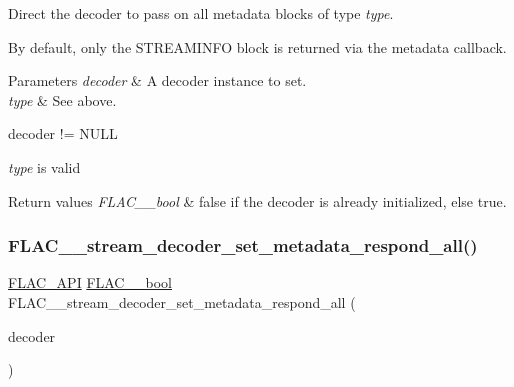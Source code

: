 Direct the decoder to pass on all metadata blocks of type {\itshape type}.

By default, only the {\ttfamily S\+T\+R\+E\+A\+M\+I\+N\+FO} block is returned via the metadata callback. 
\begin{DoxyParams}{Parameters}
{\em decoder} & A decoder instance to set. \\
\hline
{\em type} & See above.  
\begin{DoxyCode}
decoder != NULL 
\end{DoxyCode}
 {\itshape type} is valid \\
\hline
\end{DoxyParams}

\begin{DoxyRetVals}{Return values}
{\em F\+L\+A\+C\+\_\+\+\_\+bool} & {\ttfamily false} if the decoder is already initialized, else {\ttfamily true}. \\
\hline
\end{DoxyRetVals}
\mbox{\label{group__flac__stream__decoder_gaf3bec52172d727a4db8209b82db00c84}} 
\subsubsection{\texorpdfstring{F\+L\+A\+C\+\_\+\+\_\+stream\+\_\+decoder\+\_\+set\+\_\+metadata\+\_\+respond\+\_\+all()}{FLAC\_\_stream\_decoder\_set\_metadata\_respond\_all()}}
{\footnotesize\ttfamily \hyperlink{group__flac__export_ga56ca07df8a23310707732b1c0007d6f5}{F\+L\+A\+C\+\_\+\+A\+PI} \hyperlink{ordinals_8h_a95103469f1cbd78b8cf250194985b34e}{F\+L\+A\+C\+\_\+\+\_\+bool} F\+L\+A\+C\+\_\+\+\_\+stream\+\_\+decoder\+\_\+set\+\_\+metadata\+\_\+respond\+\_\+all (\begin{DoxyParamCaption}\item[{\hyperlink{struct_f_l_a_c_____stream_decoder}{F\+L\+A\+C\+\_\+\+\_\+\+Stream\+Decoder} $\ast$}]{decoder }\end{DoxyParamCaption})}

